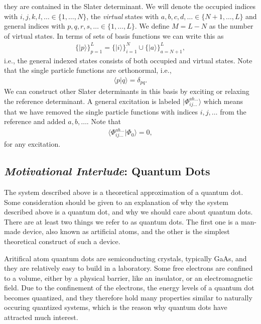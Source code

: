 \documentclass[
    a4paper, aps, twocolumn, floatfix, superscriptaddress,
    nofootinbib]{revtex4-1}
\newcommand{\1}{\mathds{1}}
\newcommand{\ket}[1]{\rvert #1\rangle}
\newcommand{\braket}[2]{\langle #1 \vert #2 \rangle}
\begin{document}
    they are contained in the Slater determinant.  We will denote the occupied
    indices with $i, j, k, l, \dots \in \{1, \dots, N\}$, the \emph{virtual}
    states with $a, b, c, d, \dots \in \{N + 1, \dots, L\}$ and general indices
    with $p, q, r, s, \dots \in \{1, \dots, L\}$. We define $M = L - N$ as the
    number of virtual states. In terms of sets of basis functions we can write
    this as
    \begin{align}
        \{\ket{p}\}_{p = 1}^L
        = \{\ket{i}\}_{i = 1}^N
        \cup
        \{\ket{a}\}_{a = N + 1}^L,
    \end{align}
    i.e., the general indexed states consists of both occupied and virtual
    states. Note that the single particle functions are orthonormal, i.e.,
    \begin{align}
        \braket{p}{q} = \delta_{pq}.
    \end{align}
    We can construct other Slater determinants in this basis by exciting
    or relaxing the reference determinant. A general excitation is labeled
    $\ket{\Phi_{ij\dots}^{ab\dots}}$ which means that we have removed the single
    particle functions with indices $i, j, \dots$ from the reference and added
    $a, b, \dots$. Note that
    \begin{align}
        \braket{\Phi^{ab\dots}_{ij\dots}}{\Phi_0} = 0,
        \label{eq:excited_overlap}
    \end{align}
    for any excitation.

    \subsection{\emph{Motivational Interlude}: Quantum Dots}

        The system described above is a theoretical approximation of a quantum
        dot. Some consideration should be given to an explanation of why the
        system described above is a quantum dot, and why we should care about
        quantum dots.  There are at least two things we refer to as quantum
        dots. The first one is a man-made device, also known as artificial
        atoms, and the other is the simplest theoretical construct of such a
        device.

        Aritifical atom quantum dots are semiconducting crystals, typically
        GaAs, and they are relatively easy to build in a laboratory. Some free
        electrons are confined to a volume, either by a physical barrier, like
        an insulator, or an electromagnetic field\cite{reimann2002electronic}.
        Due to the confinement of the electrons, the energy levels of a quantum
        dot becomes quantized, and they therefore hold many properties similar
        to naturally occuring quantized systems, which is the reason why quantum
        dots have attracted much interest.
\end{document}
